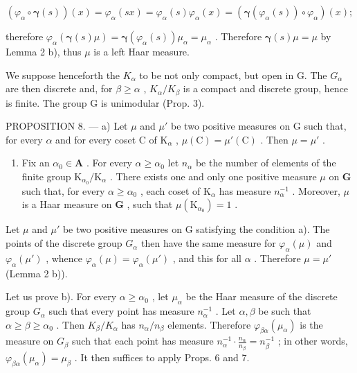 \[
\left(\varphi_ {\alpha} \circ \boldsymbol {\gamma} (s)\right) (x) = \varphi_ {\alpha} (s x) = \varphi_ {\alpha} (s) \varphi_ {\alpha} (x) = \left(\boldsymbol {\gamma} (\varphi_ {\alpha} (s)) \circ \varphi_ {\alpha}\right) (x);
\]

therefore \(\varphi_{\alpha}(\pmb{\gamma}(s)\mu) = \pmb{\gamma}(\varphi_{\alpha}(s))\mu_{\alpha} = \mu_{\alpha}\) . Therefore \(\pmb{\gamma}(s)\mu = \mu\) by Lemma 2 b), thus \(\mu\) is a left Haar measure.

We suppose henceforth the \(K_{\alpha}\) to be not only compact, but open in G. The \(G_{\alpha}\) are then discrete and, for \(\beta \geqslant \alpha\) , \(K_{\alpha}/K_{\beta}\) is a compact and discrete group, hence is finite. The group G is unimodular (Prop. 3).

PROPOSITION 8. --- a) Let \(\mu\) and \(\mu'\) be two positive measures on G such that, for every \(\alpha\) and for every coset C of \(\mathrm{K}_{\alpha}\) , \(\mu(\mathrm{C}) = \mu'(\mathrm{C})\) . Then \(\mu = \mu'\) .

\begin{enumerate}
\def\labelenumi{\alph{enumi})}
\setcounter{enumi}{1}
\tightlist
\item
  Fix an \(\alpha_0 \in \mathbf{A}\) . For every \(\alpha \geqslant \alpha_0\) let \(n_{\alpha}\) be the number of elements of the finite group \(\mathrm{K}_{\alpha_0} / \mathrm{K}_{\alpha}\) . There exists one and only one positive measure \(\mu\) on \(\mathbf{G}\) such that, for every \(\alpha \geqslant \alpha_0\) , each coset of \(\mathrm{K}_{\alpha}\) has measure \(n_{\alpha}^{-1}\) . Moreover, \(\mu\) is a Haar measure on \(\mathbf{G}\) , such that \(\mu(\mathrm{K}_{\alpha_0}) = 1\) .
\end{enumerate}

Let \(\mu\) and \(\mu'\) be two positive measures on G satisfying the condition a). The points of the discrete group \(G_{\alpha}\) then have the same measure for \(\varphi_{\alpha}(\mu)\) and \(\varphi_{\alpha}(\mu')\) , whence \(\varphi_{\alpha}(\mu) = \varphi_{\alpha}(\mu')\) , and this for all \(\alpha\) . Therefore \(\mu = \mu'\) (Lemma 2 b)).

Let us prove b). For every \(\alpha \geqslant \alpha_0\) , let \(\mu_{\alpha}\) be the Haar measure of the discrete group \(G_{\alpha}\) such that every point has measure \(n_{\alpha}^{-1}\) . Let \(\alpha, \beta\) be such that \(\alpha \geqslant \beta \geqslant \alpha_0\) . Then \(K_{\beta}/K_{\alpha}\) has \(n_{\alpha}/n_{\beta}\) elements. Therefore \(\varphi_{\beta\alpha}(\mu_{\alpha})\) is the measure on \(G_{\beta}\) such that each point has measure \(n_{\alpha}^{-1} \cdot \frac{n_{\alpha}}{n_{\beta}} = n_{\beta}^{-1}\) ; in other words, \(\varphi_{\beta\alpha}(\mu_{\alpha}) = \mu_{\beta}\) . It then suffices to apply Props. 6 and 7.

